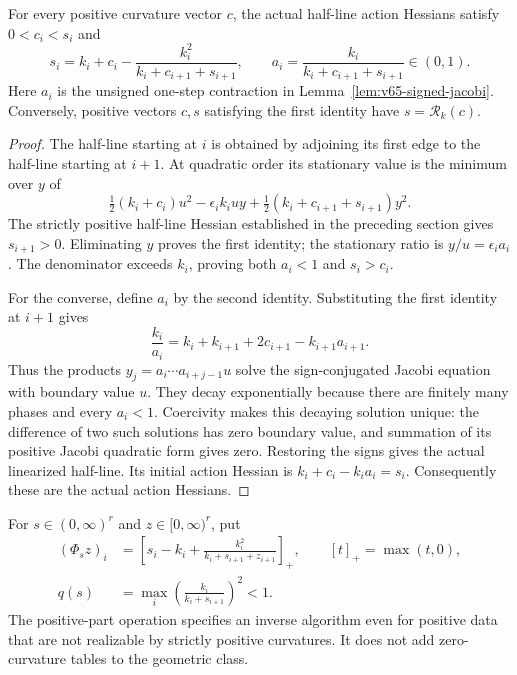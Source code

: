 \begin{lemma}\label{lem:v66-riccati}
For every positive curvature vector $c$, the actual half-line action
Hessians satisfy $0<c_i<s_i$ and
\begin{equation}\label{eq:v66-schur}
 s_i=k_i+c_i-\frac{k_i^2}{k_i+c_{i+1}+s_{i+1}},\qquad
 a_i=\frac{k_i}{k_i+c_{i+1}+s_{i+1}}\in(0,1).
\end{equation}
Here $a_i$ is the unsigned one-step contraction in
Lemma~\ref{lem:v65-signed-jacobi}.  Conversely, positive vectors $c,s$
satisfying the first identity have $s=\mathcal R_k(c)$.
\end{lemma}
\begin{proof}
The half-line starting at $i$ is obtained by adjoining its first edge
to the half-line starting at $i+1$.  At quadratic order its stationary
value is the minimum over $y$ of
\[
 \tfrac12(k_i+c_i)u^2-\epsilon_i k_iuy
                  +\tfrac12(k_i+c_{i+1}+s_{i+1})y^2.
\]
The strictly positive half-line Hessian established in the preceding
section gives $s_{i+1}>0$.  Eliminating $y$ proves the first identity;
the stationary ratio is $y/u=\epsilon_i a_i$.  The denominator exceeds
$k_i$, proving both $a_i<1$ and $s_i>c_i$.

For the converse, define $a_i$ by the second identity.  Substituting the
first identity at $i+1$ gives
\[
 \frac{k_i}{a_i}
   =k_i+k_{i+1}+2c_{i+1}-k_{i+1}a_{i+1}.
\]
Thus the products $y_j=a_i\cdots a_{i+j-1}u$ solve the sign-conjugated
Jacobi equation with boundary value $u$.  They decay exponentially
because there are finitely many phases and every $a_i<1$.  Coercivity
makes this decaying solution unique: the difference of two such solutions
has zero boundary value, and summation of its positive Jacobi quadratic
form gives zero.  Restoring the signs gives the actual linearized
half-line.  Its initial action Hessian is $k_i+c_i-k_i a_i=s_i$.
Consequently these are the actual action Hessians.
\end{proof}

For $s\in(0,\infty)^r$ and $z\in[0,\infty)^r$, put
\begin{equation}\label{eq:v66-projection-map}
 \begin{aligned}
 (\Phi_s z)_i&=
 \left[s_i-k_i+\frac{k_i^2}{k_i+s_{i+1}+z_{i+1}}\right]_+,
 \qquad [t]_+=\max(t,0),\\
 q(s)&=\max_i\left(\frac{k_i}{k_i+s_{i+1}}\right)^2<1.
 \end{aligned}
\end{equation}
The positive-part operation specifies an inverse algorithm even for
positive data that are not realizable by strictly positive curvatures.
It does not add zero-curvature tables to the geometric class.

